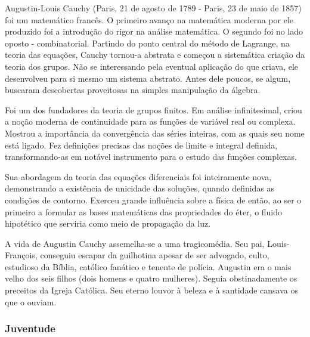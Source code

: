 
Augustin-Louis Cauchy (Paris, 21 de agosto de 1789 - Paris, 23 de maio de 1857) foi um matemático francês. O primeiro avanço na matemática moderna por ele produzido foi a introdução do rigor na análise matemática. O segundo foi no lado oposto - combinatorial. Partindo do ponto central do método de Lagrange, na teoria das equações, Cauchy tornou-a abstrata e começou a sistemática criação da teoria dos grupos. Não se interessando pela eventual aplicação do que criava, ele desenvolveu para si mesmo um sistema abstrato. Antes dele poucos, se algum, buscaram descobertas proveitosas na simples manipulação da álgebra.

Foi um dos fundadores da teoria de grupos finitos. Em análise infinitesimal, criou a noção moderna de continuidade para as funções de variável real ou complexa. Mostrou a importância da convergência das séries inteiras, com as quais seu nome está ligado. Fez definições precisas das noções de limite e integral definida, transformando-as em notável instrumento para o estudo das funções complexas.

Sua abordagem da teoria das equações diferenciais foi inteiramente nova, demonstrando a existência de unicidade das soluções, quando definidas as condições de contorno. Exerceu grande influência sobre a física de então, ao ser o primeiro a formular as bases matemáticas das propriedades do éter, o fluido hipotético que serviria como meio de propagação da luz.

A vida de Augustin Cauchy assemelha-se a uma tragicomédia. Seu pai, Louis-François, conseguiu escapar da guilhotina apesar de ser advogado, culto, estudioso da Bíblia, católico fanático e tenente de polícia. Augustin era o mais velho dos seis filhos (dois homens e quatro mulheres). Seguia obstinadamente os preceitos da Igreja Católica. Seu eterno louvor à beleza e à santidade cansava os que o ouviam.


\subsubsection{Juventude}

